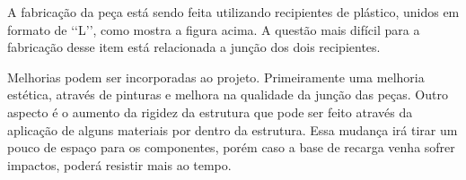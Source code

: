 \begin{itemize}
        A fabricação da peça está sendo feita utilizando recipientes de plástico, unidos em formato de \lq\lq L\rq\rq, como mostra a figura acima. A questão mais difícil para a fabricação desse item está relacionada a junção dos dois recipientes.

        Melhorias podem ser incorporadas ao projeto. Primeiramente uma melhoria estética, através de pinturas e melhora na qualidade da junção das peças. Outro aspecto é o aumento da rigidez da estrutura que pode ser feito através da aplicação de alguns materiais por dentro da estrutura. Essa mudança irá tirar um pouco de espaço para os componentes, porém caso a base de recarga venha sofrer impactos, poderá resistir mais ao tempo.

   \end{itemize}
 		

